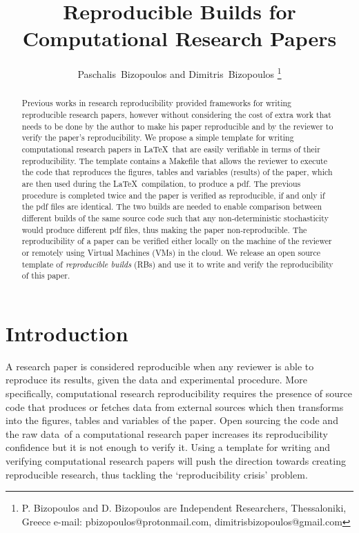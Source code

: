 \documentclass[journal]{IEEEtran}
\begin{document}

\title{Reproducible Builds for\\ Computational Research Papers}

\author{Paschalis~Bizopoulos and Dimitris~Bizopoulos
\thanks{P. Bizopoulos and D. Bizopoulos are Independent Researchers, Thessaloniki, Greece e-mail: pbizopoulos@protonmail.com, dimitrisbizopoulos@gmail.com}}

\maketitle

\begin{abstract}
	Previous works in research reproducibility provided frameworks for writing reproducible research papers, however without considering the cost of extra work that needs to be done by the author to make his paper reproducible and by the reviewer to verify the paper's reproducibility.
	We propose a simple template for writing computational research papers in \LaTeX\ that are easily verifiable in terms of their reproducibility.
	The template contains a Makefile that allows the reviewer to execute the code that reproduces the figures, tables and variables (results) of the paper, which are then used during the \LaTeX\ compilation, to produce a pdf.
	The previous procedure is completed twice and the paper is verified as reproducible, if and only if the pdf files are identical.
	The two builds are needed to enable comparison between different builds of the same source code such that any non-deterministic stochasticity would produce different pdf files, thus making the paper non-reproducible.
	The reproducibility of a paper can be verified either locally on the machine of the reviewer or remotely using Virtual Machines (VMs) in the cloud.
	We release an open source template of \textit{reproducible builds} (RBs) and use it to write and verify the reproducibility of this paper.
\end{abstract}

\section{Introduction}
A research paper is considered reproducible when any reviewer is able to reproduce its results, given the data and experimental procedure.
More specifically, computational research reproducibility requires the presence of source code that produces or fetches data from external sources which then transforms into the figures, tables and variables of the paper.
Open sourcing the code and the raw data of a computational research paper increases its reproducibility confidence but it is not enough to verify it.
Using a template for writing and verifying computational research papers will push the direction towards creating reproducible research, thus tackling the `reproducibility crisis' problem.
\end{document}
